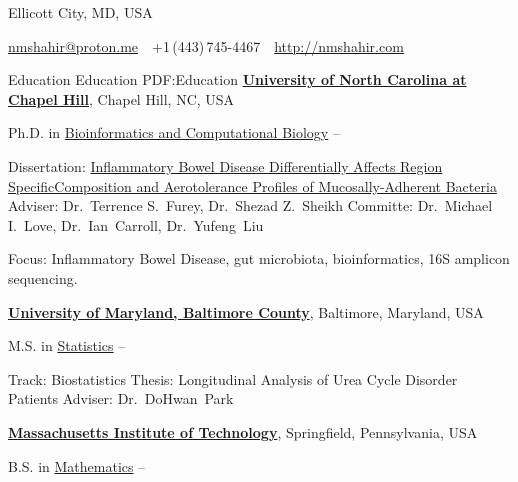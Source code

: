 \documentclass[letterpaper,MMMyyyy,nonstopmode]{simpleresumecv}
\newcommand{\CVAuthor}{Nur M Shahir, PhD}
\newcommand{\CVWebpage}{http://nmshahir.com}
\begin{document}

\Title{\CVAuthor}

\begin{SubTitle}
{Ellicott City, MD, USA}
\par
\href{mailto:nmshahir@proton.me}
{nmshahir@proton.me}
\,\SubBulletSymbol\,
+1\,(443)\,745-4467
\,\SubBulletSymbol\,
\href{\CVWebpage}
{\url{\CVWebpage}}
\end{SubTitle}

\begin{Body}


\Section
{Education}
{Education}
{PDF:Education}
\Entry
\href{http://www.unc.edu/}
{\textbf{University of North Carolina at Chapel Hill}},
Chapel Hill, NC, USA

\Gap
\BulletItem
Ph.D. in
\href{https://bcb.unc.edu/}
{Bioinformatics and Computational Biology}
\hfill
{} --
\begin{Detail}
\SubBulletItem
Dissertation:
\href{https://cdr.lib.unc.edu/concern/dissertations/z029pb27b}
{Inflammatory Bowel Disease Differentially Affects Region Specific\newline Composition and Aerotolerance Profiles of Mucosally-Adherent Bacteria}
\SubBulletItem
Adviser:
Dr.~Terrence S.~Furey, Dr.~Shezad Z.~Sheikh
\SubBulletItem
Committe:
Dr.~Michael I.~Love, Dr.~Ian~Carroll, Dr.~Yufeng~Liu

\SubBulletItem
Focus:
Inflammatory Bowel Disease, gut microbiota, bioinformatics, 16S amplicon sequencing.
\end{Detail}


\BigGap
\Entry
\href{https://umbc.edu/}
{\textbf{University of Maryland, Baltimore County}},
Baltimore, Maryland, USA

\Gap
\BulletItem
M.S. in
\href{https://mathstat.umbc.edu/}
{Statistics}
\hfill
{} --
\begin{Detail}
\SubBulletItem
Track: Biostatistics
\SubBulletItem
Thesis: Longitudinal Analysis of Urea Cycle Disorder Patients
\SubBulletItem
Adviser: Dr.~DoHwan~Park
\end{Detail}

\BigGap
\Entry
\href{https://web.mit.edu/}
{\textbf{Massachusetts Institute of Technology}},
Springfield, Pennsylvania, USA

\Gap
\BulletItem
B.S. in
\href{https://math.mit.edu/}
{Mathematics}
\hfill
{} --


\end{Body}
\end{document}
